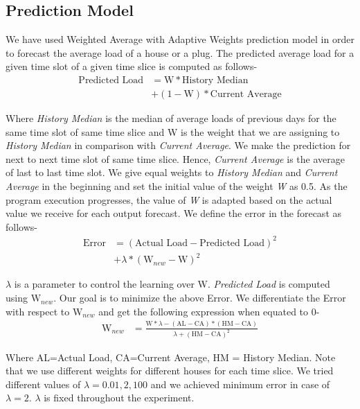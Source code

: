 \subsection{Prediction Model}
We have used Weighted Average with Adaptive Weights prediction model in order to forecast the average load of a house or a plug.
The predicted average load for a given time slot of a given time slice is computed as follows-
\begin{align*}
\mbox{Predicted Load} &= \mbox{W}*\mbox{History Median} \\ &+ (1-\mbox{W})*\mbox{Current Average}
\end{align*}

\noindent Where \textit{History Median} is the median of average loads of previous days for the same time slot of same time slice and W is the weight that we are assigning to \textit{History Median} in comparison with \textit{Current Average}.
We make the prediction for next to next time slot of same time slice.
Hence, \textit{Current Average} is the average of last to last time slot.
We give equal weights to \textit{History Median} and \textit{Current Average} in the beginning and set the initial value of the weight \textit{W} as 0.5.
As the program execution progresses, the value of \textit{W} is adapted based on the actual value we receive for each output forecast.
We define the error in the forecast as follows-
\begin{align*}
\mbox{Error} &= (\mbox{Actual Load} - \mbox{Predicted Load})^2\\ &+ \lambda * (\mbox{W}_{new} - \mbox{W})^2
\end{align*}

\noindent $\lambda$ is a parameter to control the learning over W.
\textit{Predicted Load} is computed using $\mbox{W}_{new}$.
Our goal is to minimize the above Error.
We differentiate the Error with respect to $\mbox{W}_{new}$ and get the following expression when equated to 0-
\begin{align*}
\mbox{W}_{new} &= \frac{\mbox{W}*\lambda-(\mbox{AL}-\mbox{CA}) * (\mbox{HM}-\mbox{CA})}{\lambda + (\mbox{HM}-\mbox{CA})^2}
\end{align*}

\noindent Where AL=Actual Load, CA=Current Average, HM = History Median.
Note that we use different weights for different houses for each time slice.
We tried different values of $\lambda=0.01, 2, 100$ and we achieved minimum error in case of $\lambda = 2$.
$\lambda$ is fixed throughout the experiment.


